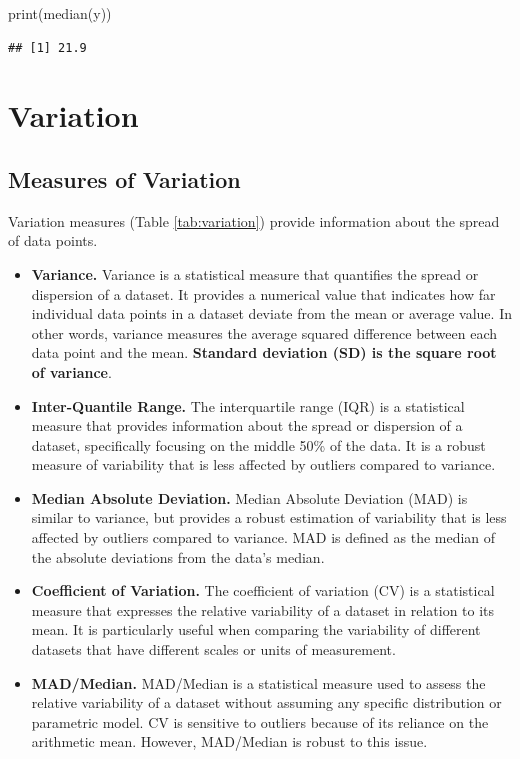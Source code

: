 \documentclass[
]{book}
\newenvironment{Shaded}{\begin{snugshade}}{\end{snugshade}}
\newcommand{\FunctionTok}[1]{\textcolor[rgb]{0.00,0.00,0.00}{#1}}
\newcommand{\NormalTok}[1]{#1}
\begin{document}
\begin{Shaded}
\begin{Highlighting}[]
\FunctionTok{print}\NormalTok{(}\FunctionTok{median}\NormalTok{(y))}
\end{Highlighting}
\end{Shaded}

\begin{verbatim}
## [1] 21.9
\end{verbatim}

\hypertarget{variation}{%
\section{Variation}\label{variation}}

\hypertarget{measures-of-variation}{%
\subsection{Measures of Variation}\label{measures-of-variation}}

Variation measures (Table \ref{tab:variation}) provide information about the spread of data points.

\begin{itemize}
\item
  \textbf{Variance.} Variance is a statistical measure that quantifies the spread or dispersion of a dataset. It provides a numerical value that indicates how far individual data points in a dataset deviate from the mean or average value. In other words, variance measures the average squared difference between each data point and the mean. \textbf{Standard deviation (SD) is the square root of variance}.
\item
  \textbf{Inter-Quantile Range.} The interquartile range (IQR) is a statistical measure that provides information about the spread or dispersion of a dataset, specifically focusing on the middle 50\% of the data. It is a robust measure of variability that is less affected by outliers compared to variance.
\item
  \textbf{Median Absolute Deviation.} Median Absolute Deviation (MAD) is similar to variance, but provides a robust estimation of variability that is less affected by outliers compared to variance. MAD is defined as the median of the absolute deviations from the data's median.
\item
  \textbf{Coefficient of Variation.} The coefficient of variation (CV) is a statistical measure that expresses the relative variability of a dataset in relation to its mean. It is particularly useful when comparing the variability of different datasets that have different scales or units of measurement.
\item
  \textbf{MAD/Median.} MAD/Median is a statistical measure used to assess the relative variability of a dataset without assuming any specific distribution or parametric model. CV is sensitive to outliers because of its reliance on the arithmetic mean. However, MAD/Median is robust to this issue.
\end{itemize}
\end{document}
